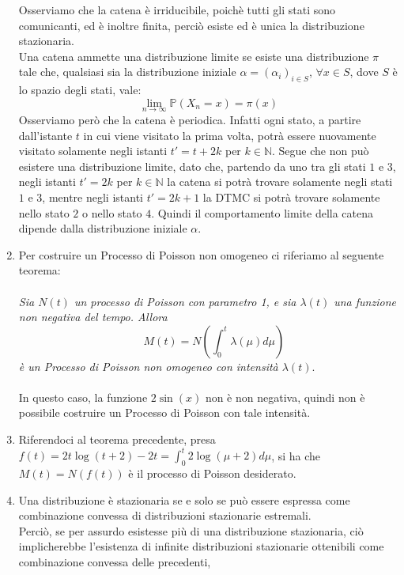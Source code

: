 \documentclass[
	12pt, %
]{fphw}
\begin{document}
\begin{enumerate}
	Osserviamo che la catena è irriducibile, poichè tutti gli stati sono comunicanti, ed è inoltre finita, perciò esiste ed è unica la distribuzione stazionaria.\\
	Una catena ammette una distribuzione limite se esiste una distribuzione $\pi$ tale che, 
	qualsiasi sia la distribuzione iniziale $\alpha = (\alpha_i)_{i \in S}$, $\forall x \in S$, dove $S$ è lo spazio degli stati, vale:
	\begin{equation*}
		\lim_{n \to \infty}  \mathbb{P} (X_n = x) = \pi (x)
	\end{equation*}
	Osserviamo però che la catena è periodica. Infatti ogni stato, a partire dall'istante $t$ in cui viene visitato la prima volta, 
	potrà essere nuovamente visitato solamente negli istanti $t' = t + 2k$ per $k\in \mathbb{N}$. Segue che non può esistere una distribuzione limite, 
	dato che, partendo da uno tra gli stati $1$ e $3$, negli istanti $t' = 2k$ per $k \in \mathbb{N}$ la catena si potrà trovare solamente negli stati $1$ e $3$, mentre negli
	istanti $t' = 2k + 1$ la DTMC si potrà trovare solamente nello stato $2$ o nello stato $4$.
	Quindi il comportamento limite della catena dipende dalla distribuzione iniziale $\alpha$.
	\item Per costruire un Processo di Poisson non omogeneo ci riferiamo al seguente teorema:\\
	\\
	\null\quad \textit{Sia $N(t)$ un processo di Poisson con parametro 1, e sia $\lambda(t)$ una funzione\\
	\null\quad non negativa del tempo. Allora
	\begin{equation*}
		\quad M(t) = N(\int_0^t \lambda(\mu)d\mu)
	\end{equation*}
	\null\quad è un Processo di Poisson non omogeneo con intensità $\lambda(t)$}.\\
	\\
	In questo caso, la funzione $2\sin(x)$ non è non negativa, quindi non è possibile costruire un Processo di Poisson con tale intensità.
	\item Riferendoci al teorema precedente, presa $f(t) = 2t\log(t+2) - 2t = \int_0^t 2\log(\mu + 2)d\mu$, 
	si ha che $M(t) = N(f(t))$ è il processo di Poisson desiderato.
	\item Una distribuzione è stazionaria se e solo se può essere espressa come combinazione convessa di distribuzioni stazionarie estremali.\\
	Perciò, se per assurdo esistesse più di una distribuzione stazionaria, ciò implicherebbe l'esistenza di infinite distribuzioni stazionarie ottenibili come combinazione convessa delle precedenti,

\end{enumerate}
\end{document}
